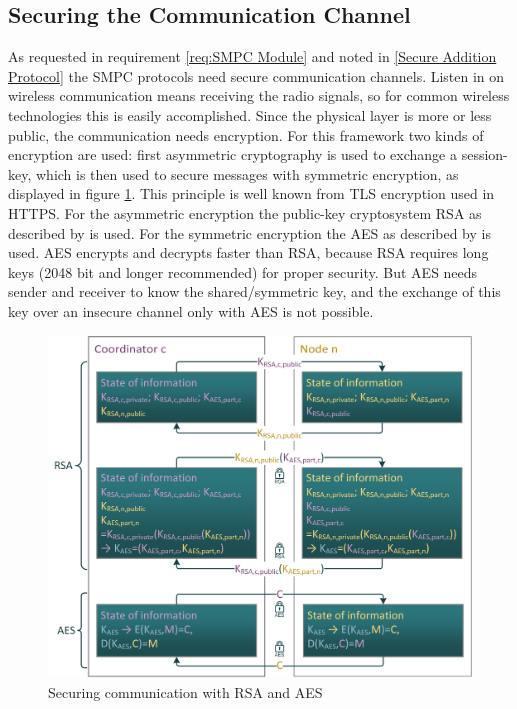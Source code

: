 \subsection{Securing the Communication Channel} \label{Securing the Communication Channel}

As requested in requirement \ref{req:SMPC Module} and noted in \ref{Secure Addition Protocol} the \gls{SMPC} protocols need secure communication channels. Listen in on wireless communication means receiving the radio signals, so for common wireless technologies this is easily accomplished. Since the physical layer is more or less public, the communication needs encryption. 
For this framework two kinds of encryption are used: first asymmetric cryptography is used to exchange a session-key, which is then used to secure messages with symmetric encryption, as displayed in figure \ref{figure:RSA/AES scheme}. This principle is well known from \gls{TLS} encryption used in \gls{HTTPS}. For the asymmetric encryption the public-key cryptosystem \acs{RSA} as described by \textcite[pp. 49-76]{Delfs2015} is used. For the symmetric encryption the \gls{AES} as described by \textcite[pp. 19-25]{Delfs2015} is used.
\gls{AES} encrypts and decrypts faster than \gls{RSA}, because \gls{RSA} requires long keys (2048 bit and longer recommended) for proper security. But \gls{AES} needs sender and receiver to know the shared/symmetric key, and the exchange of this key over an insecure channel only with \gls{AES} is not possible.

\begin{figure}[!htbp] %
	\caption{Securing communication with \gls{RSA} and \gls{AES}} \label{figure:RSA/AES scheme}
	\includegraphics[scale=1.0]{figures/encryption-ion.png}
\end{figure}

